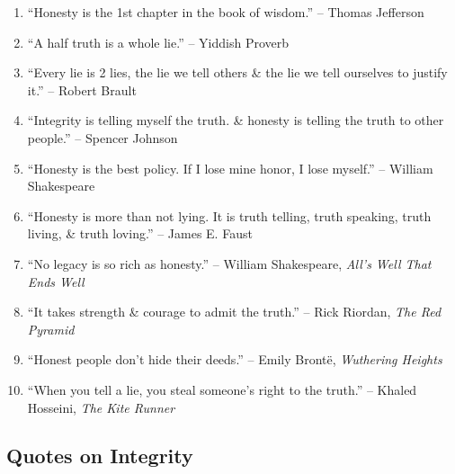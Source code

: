 \documentclass{article}
\begin{document}
\begin{enumerate}
	\item ``Honesty is the 1st chapter in the book of wisdom.'' -- Thomas Jefferson
	\item ``A half truth is a whole lie.'' -- Yiddish Proverb
	\item ``Every lie is 2 lies, the lie we tell others \& the lie we tell ourselves to justify it.'' -- Robert Brault
	\item ``Integrity is telling myself the truth. \& honesty is telling the truth to other people.'' -- Spencer Johnson
	\item ``Honesty is the best policy. If I lose mine honor, I lose myself.'' -- William Shakespeare
	\item ``Honesty is more than not lying. It is truth telling, truth speaking, truth living, \& truth loving.'' -- James E. Faust
	\item ``No legacy is so rich as honesty.'' -- William Shakespeare, {\it All's Well That Ends Well}
	\item ``It takes strength \& courage to admit the truth.'' -- Rick Riordan, {\it The Red Pyramid}
	\item ``Honest people don't hide their deeds.'' -- Emily Bront\"e, {\it Wuthering Heights}
	\item ``When you tell a lie, you steal someone's right to the truth.'' -- Khaled Hosseini, {\it The Kite Runner}
\end{enumerate}

\subsection{Quotes on Integrity}
\end{document}
